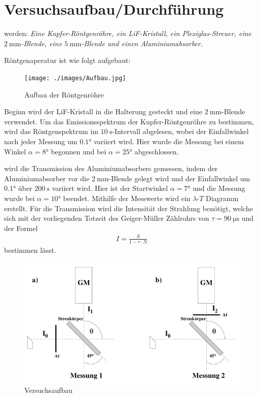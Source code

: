 \newpage
\section{Versuchsaufbau/Durchführung}
    \justifying werden: \textit{Eine Kupfer-Röntgenröhre, ein LiF-Kristall, ein Plexiglas-Streuer, eine $\SI{2}{\milli\meter}$-Blende, eine $\SI{5}
    {\milli\meter}$-Blende und einen Aluminiumabsorber.}

    \justifying Röntgenaperatur ist wie folgt aufgebaut:
    \begin{figure}
        \centering
        \texttt{[image: ./images/Aufbau.jpg]}
        \caption{Aufbau der Röntgenröhre \cite{V603}}
        \label{fig:1}
    \end{figure}

    \justifying Beginn wird der LiF-Kristall in die Halterung gesteckt und eine $\SI{2}{\milli\meter}$-Blende verwendet. Um das Emissionsspektrum der Kupfer-Röntgenröhre 
    zu bestimmen, wird das Röntgenspektrum im $\SI{10}{\second}$-Intervall abgelesen, wobei der Einfallwinkel nach jeder Messung um $0.1°$ variiert wird.
    Hier wurde die Messung bei einem Winkel $\alpha = 8°$ begonnen und bei $\alpha = 25°$ abgeschlossen. 

    \justifying wird die Transmission des Aluminiumabsorbers gemessen, indem der Aluminiumabsorber vor die $\SI{2}{\milli\meter}$-Blende gelegt wird und
    der Einfallwinkel um 0.1° über $\SI{200}{\second}$ variiert wird. Hier ist der Startwinkel $\alpha = 7°$ und die Messung wurde bei $\alpha = 10°$ beendet. 
    Mithilfe der Messwerte wird ein $\lambda$-$T$ Diagramm erstellt. Für die Transmission wird die Intensität der Strahlung benötigt, welche sich mit der vorliegenden
    Totzeit des Geiger-Müller Zählrohrs von $\tau = \SI{90}{\micro\second}$ und der Formel
    \begin{align}
        I = \frac{N}{1- \tau \cdot N} \label{eq:4}
    \end{align}
    bestimmen lässt. 

    \begin{figure}
        \centering
        \includegraphics[width=0.75\linewidth]{./images/Aufbau2.jpg}
        \caption{Versuchsaufbau \cite{V603}}
        \label{fig:1b}
    \end{figure}

